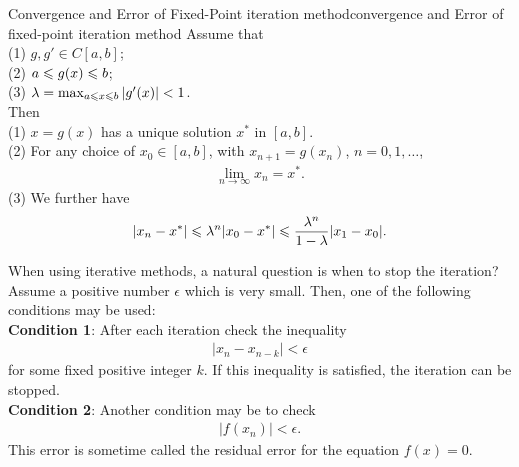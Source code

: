 \begin{theorem}{Convergence and Error of Fixed-Point iteration method}{convergence and Error of fixed-point iteration method}
    Assume that \\
    (1) $g,g'\in C[a,b]$;\\
    (2) $a \leqslant g(x) \leqslant b$;\\
    (3) $\lambda = \max_{a\leqslant x\leqslant b}|g'(x)|< 1$.\\
    Then \\
    (1) $x=g(x)$ has a unique solution $x^*$ in $[a,b]$.\\
    (2) For any choice of $x_0\in [a,b]$, with $x_{n+1}=g(x_n)$, $n=0,1,\dots$,
    \begin{align}
        \lim_{n\rightarrow \infty} x_n=x^*.
    \end{align}
    (3) We further have
    \begin{align}
        |x_n-x^*|\leqslant \lambda^n |x_0-x^*|\leqslant \frac{\lambda^n}{1-\lambda}|x_1-x_0|.
    \end{align}
\end{theorem}
\par
When using iterative methods, a natural question is when to stop the iteration?
Assume a positive number $\epsilon$ which is very small. Then, one of the following conditions may be used:\\
\textbf{Condition 1}: After each iteration check the inequality
\begin{align}
    |x_n-x_{n-k}|<\epsilon
\end{align}
for some fixed positive integer $k$. If this inequality is satisfied, 
the iteration can be stopped.\\
\textbf{Condition 2}: Another condition may be to check
\begin{align*}
    |f(x_n)|<\epsilon.
\end{align*}
This error is sometime called the residual error for the equation $f(x)=0$.


